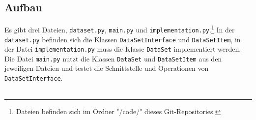 \documentclass[
    12pt, %
    a4paper, %
    parskip=full, %
    ]{scrartcl}
\begin{document}
        \subsection{Aufbau}
        Es gibt drei Dateien, \texttt{dataset.py}, \texttt{main.py} und \texttt{implementation.py}.\footnote{Dateien befinden sich im Ordner "/code/" dieses Git-Repositories.}
        In der \texttt{dataset.py} befinden sich die Klassen \texttt{DataSetInterface} und \texttt{DataSetItem},
        in der Datei \texttt{implementation.py} muss die Klasse \texttt{DataSet} implementiert werden.
        Die Datei \texttt{main.py} nutzt die Klassen \texttt{DataSet} und \texttt{DataSetItem} aus den jeweiligen Dateien und testet die Schnittstelle und Operationen von \texttt{DataSetInterface}.\\
        \\
\end{document}
